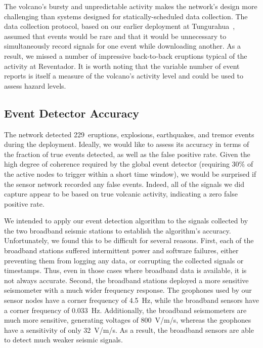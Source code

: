 The volcano's bursty and unpredictable activity makes the network's design
more challenging than systems designed for statically-scheduled data
collection. The data collection protocol, based on our earlier deployment at
Tungurahua~\cite{volcano-ewsn05}, assumed that events would be rare and that
it would be unnecessary to simultaneously record signals for one event while
downloading another. As a result, we missed a number of impressive
back-to-back eruptions typical of the activity at Reventador. It is worth
noting that the variable number of event reports is itself a measure of the
volcano's activity level and could be used to assess hazard levels. 

\subsection{Event Detector Accuracy}
\label{sec-eventdetectaccuracy}

The network detected 229~eruptions, explosions, earthquakes, and tremor
events during the deployment. Ideally, we would like to assess its accuracy
in terms of the fraction of true events detected, as well as the false
positive rate. Given the high degree of coherence required by the global
event detector (requiring 30\% of the active nodes to trigger within a short
time window), we would be surprised if the sensor network recorded any false
events. Indeed, all of the signals we did capture appear to be based on true
volcanic activity, indicating a zero false positive rate.

We intended to apply our event detection algorithm to the signals collected
by the two broadband seismic stations to establish the algorithm's accuracy.
Unfortunately, we found this to be difficult for several reasons. First, each
of the broadband stations suffered intermittent power and software failures,
either preventing them from logging any data, or corrupting the collected
signals or timestamps. Thus, even in those cases where broadband data is
available, it is not always accurate. Second, the broadband stations deployed
a more sensitive seismometer with a much wider frequency response.  The
geophones used by our sensor nodes have a corner frequency of 4.5~Hz, while
the broadband sensors have a corner frequency of 0.033~Hz. Additionally, the
broadband seismometers are much more sensitive, generating voltages of
800~V/m/s, whereas the geophones have a sensitivity of only 32~V/m/s. As a
result, the broadband sensors are able to detect much weaker seismic signals.

